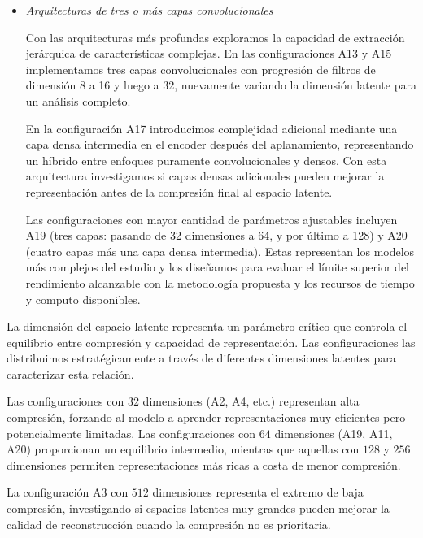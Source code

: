 \begin{itemize}
    \item \emph{Arquitecturas de tres o más capas convolucionales}
    
    Con las arquitecturas más profundas exploramos la capacidad de extracción jerárquica de características complejas. En las configuraciones A13 y A15 implementamos tres capas convolucionales con progresión de filtros de dimensión 8 a 16 y luego a 32, nuevamente variando la dimensión latente para un análisis completo.
    
    En la configuración A17 introducimos complejidad adicional mediante una capa densa intermedia en el encoder después del aplanamiento, representando un híbrido entre enfoques puramente convolucionales y densos. Con esta arquitectura investigamos si capas densas adicionales pueden mejorar la representación antes de la compresión final al espacio latente.
    
    Las configuraciones con mayor cantidad de parámetros ajustables incluyen A19 (tres capas: pasando de 32 dimensiones a 64, y por último a 128) y A20 (cuatro capas más una capa densa intermedia). Estas representan los modelos más complejos del estudio y los diseñamos para evaluar el límite superior del rendimiento alcanzable con la metodología propuesta y los recursos de tiempo y computo disponibles.

\end{itemize}


La dimensión del espacio latente representa un parámetro crítico que controla el equilibrio entre compresión y capacidad de representación. Las configuraciones las distribuimos estratégicamente a través de diferentes dimensiones latentes para caracterizar esta relación.

Las configuraciones con $32$ dimensiones (A2, A4, etc.) representan alta compresión, forzando al modelo a aprender representaciones muy eficientes pero potencialmente limitadas. Las configuraciones con $64$ dimensiones (A19, A11, A20) proporcionan un equilibrio intermedio, mientras que aquellas con $128$ y $256$ dimensiones permiten representaciones más ricas a costa de menor compresión.

La configuración A3 con $512$ dimensiones representa el extremo de baja compresión, investigando si espacios latentes muy grandes pueden mejorar la calidad de reconstrucción cuando la compresión no es prioritaria.


